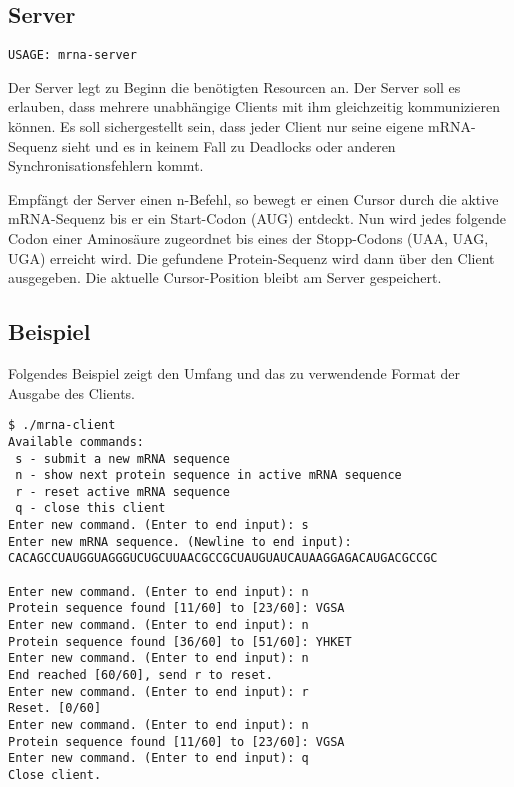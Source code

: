 \subsection*{Server}

\begin{verbatim}
USAGE: mrna-server
\end{verbatim}

Der Server legt zu Beginn die benötigten Resourcen an.
Der Server soll es erlauben, dass mehrere unabhängige Clients mit ihm
gleichzeitig kommunizieren können. Es soll sichergestellt sein, dass jeder
Client nur seine eigene mRNA-Sequenz sieht und es in keinem Fall zu Deadlocks
oder anderen Synchronisationsfehlern kommt.

Empfängt der Server einen n-Befehl, so bewegt er einen Cursor durch die aktive
mRNA-Sequenz bis er ein Start-Codon (AUG) entdeckt. Nun wird jedes folgende
Codon einer Aminosäure zugeordnet bis eines der Stopp-Codons (UAA, UAG, UGA)
erreicht wird. Die gefundene Protein-Sequenz wird dann über den Client
ausgegeben. Die aktuelle Cursor-Position bleibt am Server gespeichert.

\subsection*{Beispiel}

Folgendes Beispiel zeigt den Umfang und das zu verwendende Format der
Ausgabe des Clients.


\begin{verbatim}
$ ./mrna-client
Available commands:
 s - submit a new mRNA sequence
 n - show next protein sequence in active mRNA sequence
 r - reset active mRNA sequence
 q - close this client
Enter new command. (Enter to end input): s
Enter new mRNA sequence. (Newline to end input):
CACAGCCUAUGGUAGGGUCUGCUUAACGCCGCUAUGUAUCAUAAGGAGACAUGACGCCGC

Enter new command. (Enter to end input): n
Protein sequence found [11/60] to [23/60]: VGSA
Enter new command. (Enter to end input): n
Protein sequence found [36/60] to [51/60]: YHKET
Enter new command. (Enter to end input): n
End reached [60/60], send r to reset.
Enter new command. (Enter to end input): r
Reset. [0/60]
Enter new command. (Enter to end input): n
Protein sequence found [11/60] to [23/60]: VGSA
Enter new command. (Enter to end input): q
Close client.
\end{verbatim}




\osueguidelinesthree


